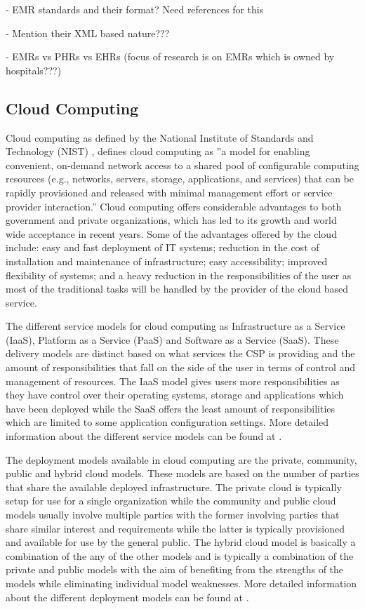 - EMR standards and their format? Need references for this

- Mention their XML based nature???

- EMRs vs PHRs vs EHRs (focus of research is on EMRs which is owned by hospitals???)

\subsection{Cloud Computing}

Cloud computing as defined by the National Institute of Standards and Technology (NIST) \cite{nist}, defines cloud computing as ''a model for enabling convenient, on-demand network access to a shared pool of configurable computing resources (e.g., networks, servers, storage, applications, and services) that can be rapidly provisioned and released with minimal management effort or service provider interaction.'' Cloud computing offers considerable advantages to both government and private organizations, which has led to its growth and world wide acceptance in recent years. Some of the advantages offered by the cloud include: easy and fast deployment of IT systems; reduction in the cost of installation and maintenance of infrastructure; easy accessibility; improved flexibility of systems; and a heavy reduction in the responsibilities of the user as most of the traditional tasks will be handled by the provider of the cloud based service.

The different service models for cloud computing as Infrastructure as a Service (IaaS), Platform as a Service (PaaS) and Software as a Service (SaaS). These delivery models are distinct based on what services the CSP is providing and the amount of responsibilities that fall on the side of the user in terms of control and management of resources. The IaaS model gives users more responsibilities as they have control over their operating systems, storage and applications which have been deployed while the SaaS offers the least amount of responsibilities which are limited to some application configuration settings. More detailed information about the different service models can be found at \cite{nist}.

The deployment models available in cloud computing are the private, community, public and hybrid cloud models. These models are based on the number of parties that share the available deployed infrastructure. The private cloud is typically setup for use for a single organization while the community and public cloud models usually involve multiple parties with the former involving parties that share similar interest and requirements while the latter is typically provisioned and available for use by the general public. The hybrid cloud model is basically a combination of the any of the other models and is typically a combination of the private and public models with the aim of benefiting from the strengths of the models while eliminating individual model weaknesses. More detailed information about the different deployment models can be found at \cite{nist}.

